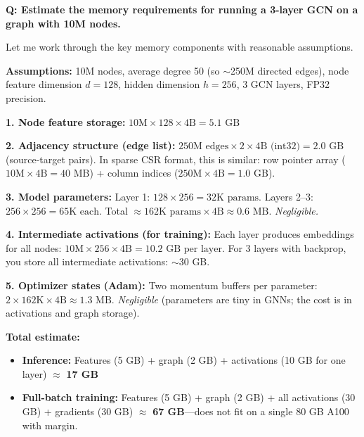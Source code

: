 \begin{interviewq}
\textbf{Q: Estimate the memory requirements for running a 3-layer GCN on a graph with 10M nodes.}

 \quad {} \quad \badgefreq{\freqlow}

\stronganswer

Let me work through the key memory components with reasonable assumptions.

\textbf{Assumptions:} 10M nodes, average degree 50 (so $\sim$250M directed edges), node feature dimension $d = 128$, hidden dimension $h = 256$, 3 GCN layers, FP32 precision.

\textbf{1. Node feature storage:}
$10\text{M} \times 128 \times 4\text{B} = 5.1\text{ GB}$

\textbf{2. Adjacency structure (edge list):}
$250\text{M edges} \times 2 \times 4\text{B (int32)} = 2.0\text{ GB}$ (source-target pairs).
In sparse CSR format, this is similar: row pointer array ($10\text{M} \times 4\text{B} = 40\text{ MB}$) + column indices ($250\text{M} \times 4\text{B} = 1.0\text{ GB}$).

\textbf{3. Model parameters:}
Layer 1: $128 \times 256 = 32\text{K params}$. Layers 2--3: $256 \times 256 = 65\text{K each}$. Total $\approx 162\text{K params} \times 4\text{B} \approx 0.6\text{ MB}$. \textit{Negligible.}

\textbf{4. Intermediate activations (for training):}
Each layer produces embeddings for all nodes: $10\text{M} \times 256 \times 4\text{B} = 10.2\text{ GB per layer}$. For 3 layers with backprop, you store all intermediate activations: $\sim$30 GB.

\textbf{5. Optimizer states (Adam):}
Two momentum buffers per parameter: $2 \times 162\text{K} \times 4\text{B} \approx 1.3\text{ MB}$. \textit{Negligible} (parameters are tiny in GNNs; the cost is in activations and graph storage).

\textbf{Total estimate:}
\begin{itemize}
    \item \textbf{Inference:} Features (5 GB) + graph (2 GB) + activations (10 GB for one layer) $\approx$ \textbf{17 GB}
    \item \textbf{Full-batch training:} Features (5 GB) + graph (2 GB) + all activations (30 GB) + gradients (30 GB) $\approx$ \textbf{67 GB}---does not fit on a single 80 GB A100 with margin.
\end{itemize}


\end{interviewq}
